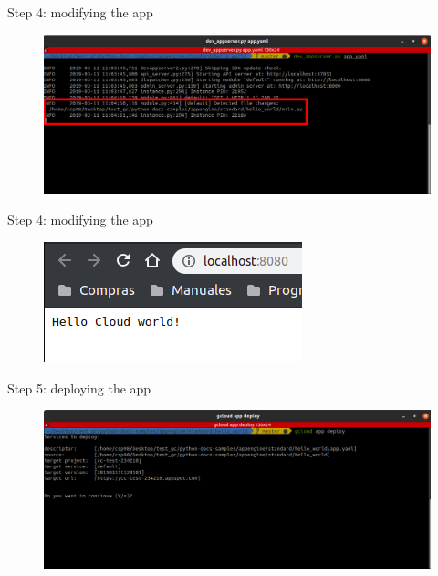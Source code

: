 \documentclass{beamer}
\begin{document}
\begin{frame}[fragile]{Step 4: modifying the app}
    \begin{figure}[H]
      \centering
      \includegraphics[scale=0.33]{../img/tutorial/6modify}
    \end{figure}
\end{frame}

\begin{frame}[fragile]{Step 4: modifying the app}
    \begin{figure}[H]
      \centering
      \includegraphics[scale=1]{../img/tutorial/7browsemodify}
    \end{figure}
\end{frame}


\begin{frame}[fragile]{Step 5: deploying the app}
    \begin{figure}[H]
      \centering
      \includegraphics[scale=0.33]{../img/tutorial/8deploy}
    \end{figure}
\end{frame}
\end{document}
